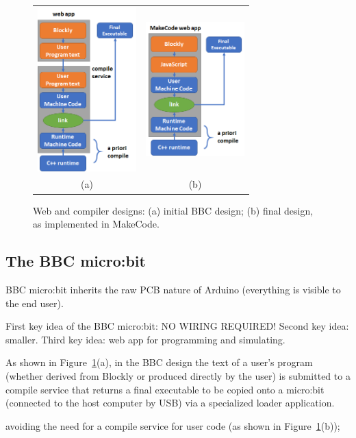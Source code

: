 \begin{figure} 
    \begin{tabular}{cc}
      \includegraphics[width=1.5in]{images/bbc.png} & \includegraphics[width=1.5in]{images/makecode.png} \\
        (a) & (b) 
    \end{tabular}
    \caption{\label{fig:design}Web and compiler designs: (a) initial BBC design; (b) final design, as implemented in MakeCode.}
    \end{figure}

    
\subsection{The BBC micro:bit}

BBC micro:bit inherits the raw PCB nature of Arduino 
(everything is visible to the end user).

First key idea of the BBC micro:bit: NO WIRING REQUIRED!
Second key idea: smaller.
Third key idea: web app for programming and simulating.

As shown in Figure~\ref{fig:design}(a), in the BBC design
the text of a user's program (whether derived from Blockly or produced directly by the user)
is submitted to a compile service that returns a final executable to be copied onto a micro:bit (connected to the host 
computer by USB) via a specialized loader application.  

avoiding the need for a compile service for user code (as shown 
in Figure~\ref{fig:design}(b));